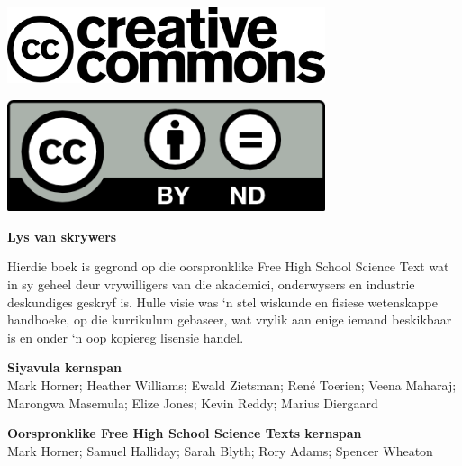 \vspace*{3.8in}

\begin{center}
\begin{minipage}{0.6\textwidth}
\includegraphics[width=0.7\textwidth]{title_images/cc2.png}
\end{minipage}
\begin{minipage}{0.3\textwidth}
\includegraphics[width=0.7\textwidth]{title_images/cc1.png}
\end{minipage}
\end{center}







\newpage
\thispagestyle{empty}


\begin{flushleft} \textbf{\huge Lys van skrywers} \end{flushleft}

{\Large Hierdie boek is gegrond op die oorspronklike Free High School Science Text wat in sy geheel deur vrywilligers van die akademici, onderwysers en industrie deskundiges geskryf is. Hulle visie was ‘n stel wiskunde en fisiese wetenskappe handboeke, op die kurrikulum gebaseer, wat vrylik aan enige iemand beskikbaar is en onder ‘n oop kopiereg lisensie handel. } \par

\textbf{\Large Siyavula kernspan} \\

Mark Horner; Heather Williams; Ewald Zietsman; Ren\'{e} Toerien; Veena Maharaj; Marongwa Masemula; Elize Jones; Kevin Reddy; Marius Diergaard \par

\textbf{\Large Oorspronklike Free High School Science Texts kernspan}\\

Mark Horner; Samuel Halliday; Sarah Blyth; Rory Adams; Spencer Wheaton \par 


